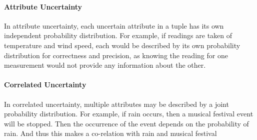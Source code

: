 \paragraph{Attribute Uncertainty}
In attribute uncertainty, each uncertain attribute in a tuple has its own independent probability distribution. For example, if readings are taken of temperature and wind speed, each would be described by its own probability distribution for correctness and precision, as knowing the reading for one measurement would not provide any information about the other.
\paragraph{Correlated Uncertainty}
In correlated uncertainty, multiple attributes may be described by a joint probability distribution. For example, if rain occurs, then a musical festival event will be stopped. Then the occurrence of the event depends on the probability of rain. And thus this makes a co-relation with rain and musical festival
